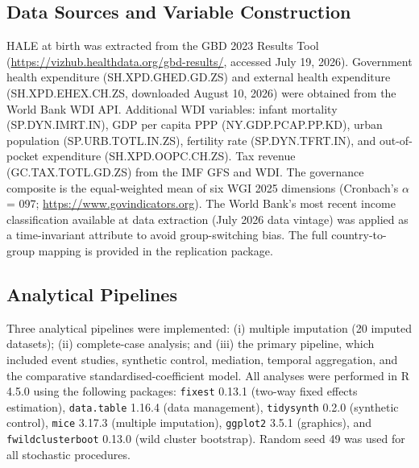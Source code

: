 \documentclass[10pt,a4paper]{article}
\begin{document}
\subsection{Data Sources and Variable Construction}
HALE at birth was extracted from the GBD 2023 Results Tool
(\url{https://vizhub.healthdata.org/gbd-results/}, accessed July 19,
2026). Government health expenditure (SH.XPD.GHED.GD.ZS) and external health expenditure (SH.XPD.EHEX.CH.ZS, downloaded August 10, 2026) were obtained from the World Bank WDI API. Additional WDI variables: infant mortality (SP.DYN.IMRT.IN), GDP per capita PPP (NY.GDP.PCAP.PP.KD), urban population (SP.URB.TOTL.IN.ZS), fertility rate (SP.DYN.TFRT.IN), and out-of-pocket expenditure (SH.XPD.OOPC.CH.ZS). Tax revenue (GC.TAX.TOTL.GD.ZS) from the IMF GFS and WDI. The governance composite is the equal-weighted mean of six WGI 2025 dimensions (Cronbach's $\alpha$ = 0{\textperiodcentered{}}97; \url{https://www.govindicators.org}). The World Bank's most recent income classification available at data extraction (July 2026 data vintage) was applied as a time-invariant attribute to avoid group-switching bias. The full country-to-group mapping is provided in the replication package.

\subsection{Analytical Pipelines}
Three analytical pipelines were implemented: (i) multiple imputation (20 imputed datasets); (ii) complete-case analysis; and (iii) the primary pipeline, which included event studies, synthetic control, mediation, temporal aggregation, and the comparative standardised-coefficient model. All analyses were performed in R 4.5.0 using the following packages: \texttt{fixest} 0.13.1 (two-way fixed effects estimation), \texttt{data.table} 1.16.4 (data management), \texttt{tidysynth} 0.2.0 (synthetic control), \texttt{mice} 3.17.3 (multiple imputation), \texttt{ggplot2} 3.5.1 (graphics), and \texttt{fwildclusterboot} 0.13.0 (wild cluster bootstrap). Random seed 49 was used for all stochastic procedures.
\end{document}
